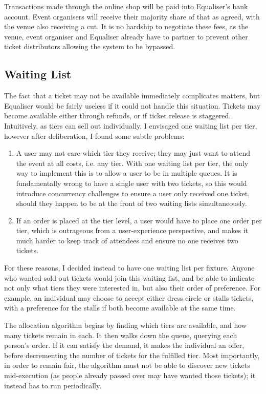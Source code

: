 \documentclass[12pt,a4paper]{bhamdissertation}
\begin{document}
Transactions made through the online shop will be paid into Equaliser's bank account. Event organisers will receive their majority share of that as agreed, with the venue also receiving a cut. It is no hardship to negotiate these fees, as the venue, event organiser and Equaliser already have to partner to prevent other ticket distributors allowing the system to be bypassed.

\subsection{Waiting List}

The fact that a ticket may not be available immediately complicates matters, but Equaliser would be fairly useless if it could not handle this situation. Tickets may become available either through refunds, or if ticket release is staggered. Intuitively, as tiers can sell out individually, I envisaged one waiting list per tier, however after deliberation, I found some subtle problems:

\begin{enumerate}
    \item A user may not care which tier they receive; they may just want to attend the event at all costs, i.e. any tier. With one waiting list per tier, the only way to implement this is to allow a user to be in multiple queues. It is fundamentally wrong to have a single user with two tickets, so this would introduce concurrency challenges to ensure a user only received one ticket, should they happen to be at the front of two waiting lists simultaneously.
    \item If an order is placed at the tier level, a user would have to place one order per tier, which is outrageous from a user-experience perspective, and makes it much harder to keep track of attendees and ensure no one receives two tickets.
\end{enumerate}

For these reasons, I decided instead to have one waiting list per fixture. Anyone who wanted sold out tickets would join this waiting list, and be able to indicate not only what tiers they were interested in, but also their order of preference. For example, an individual may choose to accept either dress circle or stalls tickets, with a preference for the stalls if both become available at the same time.

The allocation algorithm begins by finding which tiers are available, and how many tickets remain in each. It then walks down the queue, querying each person's order. If it can satisfy the demand, it makes the individual an offer, before decrementing the number of tickets for the fulfilled tier. Most importantly, in order to remain fair, the algorithm must not be able to discover new tickets mid-execution (as people already passed over may have wanted those tickets); it instead has to run periodically.
\end{document}
